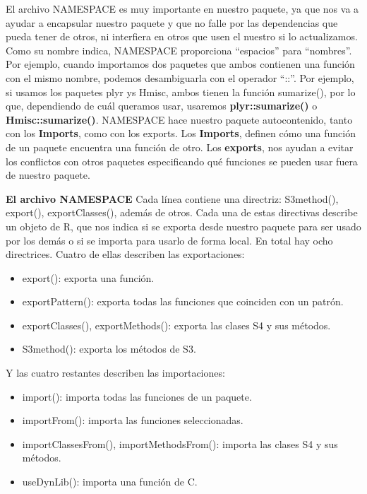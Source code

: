 El archivo NAMESPACE es muy importante en nuestro paquete, ya que nos va a ayudar a
encapsular nuestro paquete y que no falle por las dependencias que pueda tener de otros, ni
interfiera en otros que usen el nuestro si lo actualizamos.
Como su nombre indica, NAMESPACE proporciona “espacios” para “nombres”. Por ejemplo,
cuando importamos dos paquetes que ambos contienen una funci\'on con el mismo nombre,
podemos desambiguarla con el operador “::”. Por ejemplo, si usamos los paquetes plyr ys
Hmisc, ambos tienen la funci\'on sumarize(), por lo que, dependiendo de cu\'al queramos usar,
usaremos \textbf{plyr::sumarize()} o \textbf{Hmisc::sumarize()}.
NAMESPACE hace nuestro paquete autocontenido, tanto con los \textbf{Imports}, como con los
exports. Los \textbf{Imports}, definen c\'omo una funci\'on de un paquete encuentra una funci\'on de
otro. Los \textbf{exports}, nos ayudan a evitar los conflictos con otros paquetes especificando qu\'e
funciones se pueden usar fuera de nuestro paquete.

\textbf{El archivo NAMESPACE}
Cada l\'inea contiene una directriz: S3method(), export(), exportClasses(), adem\'as de otros.
Cada una de estas directivas describe un objeto de R, que nos indica si se exporta desde
nuestro paquete para ser usado por los dem\'as o si se importa para usarlo de forma local.
En total hay ocho directrices. Cuatro de ellas describen las exportaciones:

\begin{itemize}
    \item export(): exporta una funci\'on.
    \item exportPattern(): exporta todas las funciones que coinciden con un patr\'on.
    \item exportClasses(), exportMethods(): exporta las clases S4 y sus m\'etodos.
    \item S3method(): exporta los m\'etodos de S3.
\end{itemize}

Y las cuatro restantes describen las importaciones:
\begin{itemize}
    \item import(): importa todas las funciones de un paquete.
    \item importFrom(): importa las funciones seleccionadas.
    \item importClassesFrom(), importMethodsFrom(): importa las clases S4 y sus
m\'etodos.
    \item useDynLib(): importa una funci\'on de C.
\end{itemize}

